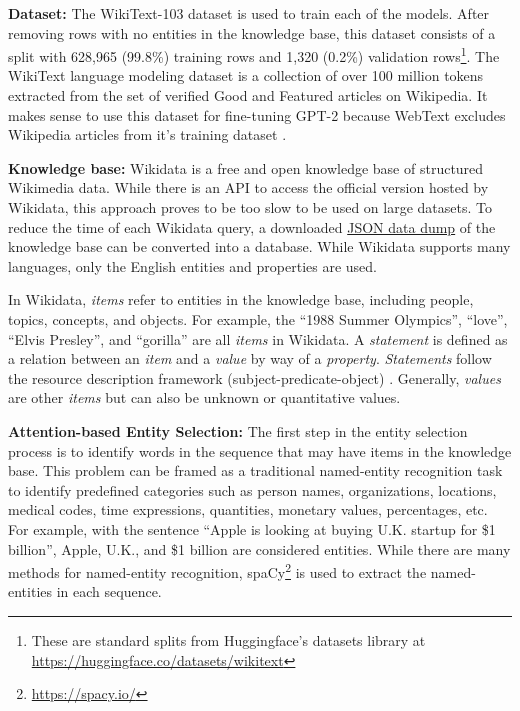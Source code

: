 \documentclass[phd,electronic,oneside,twosidetoc,letterpaper,chaptercenter,parttop,lof]{byumsphd}
\begin{document}
\textbf{Dataset:}
The WikiText-103 dataset \cite{merity2016pointer} is used to train each of the models. 
After removing rows with no entities in the knowledge base, this dataset consists of a split with 628,965 (99.8\%) training rows and 1,320 (0.2\%) validation rows\footnote{These are standard splits from Huggingface's datasets library at \url{https://huggingface.co/datasets/wikitext}}. 
The WikiText language modeling dataset is a collection of over 100 million tokens extracted from the set of verified Good and Featured articles on Wikipedia. 
It makes sense to use this dataset for fine-tuning GPT-2 because WebText excludes Wikipedia articles from it's training dataset \cite{radford2019language}.

\textbf{Knowledge base:}
Wikidata \cite{vrandecic2014wikidata} is a free and open knowledge base of structured \cite{cafarella2011structureddata} Wikimedia data.
While there is an API to access the official version hosted by Wikidata, this approach proves to be too slow to be used on large datasets.
To reduce the time of each Wikidata query, a downloaded \href{https://dumps.wikimedia.org/wikidatawiki/entities/}{JSON data dump} of the knowledge base can be converted into a database. 
While Wikidata supports many languages, only the English entities and properties are used. 

In Wikidata, \emph{items} refer to entities in the knowledge base, including people, topics, concepts, and objects. 
For example, the ``1988 Summer Olympics'', ``love'', ``Elvis Presley'', and ``gorilla'' are all \emph{items} in Wikidata.
A \emph{statement} is defined as a relation between an \emph{item} and a \emph{value} by way of a \emph{property}. 
\emph{Statements} follow the resource description framework (subject-predicate-object) \cite{miller1998rdf}.
Generally, \emph{values} are other \emph{items} but can also be unknown or quantitative values. 

\textbf{Attention-based Entity Selection:}
The first step in the entity selection process is to identify words in the sequence that may have items in the knowledge base. This problem can be framed as a traditional named-entity recognition task to identify predefined categories such as person names, organizations, locations, medical codes, time expressions, quantities, monetary values, percentages, etc.  For example, with the sentence ``Apple is looking at buying U.K. startup for \$1 billion'', Apple, U.K., and \$1 billion are considered entities. While there are many methods for named-entity recognition, spaCy\footnote{\url{https://spacy.io/}} is used to extract the named-entities in each sequence. 
\end{document}
